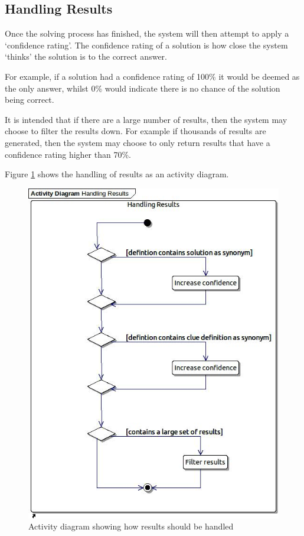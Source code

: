 \subsection{Handling Results} 
\label{sub:results}

Once the solving process has finished, the system will then attempt to apply a 
`confidence rating'. The confidence rating of a solution is how close the system
`thinks' the solution is to the correct answer.

For example, if a solution had a confidence rating of 100\% it would be deemed as 
the only answer, whilst 0\% would indicate there is no chance of the solution
being correct.

It is intended that if there are a large number of results, then the system may
choose to filter the results down. For example if thousands of results are 
generated, then the system may choose to only return results that have a 
confidence rating higher than 70\%.

Figure \ref{fig:results_activity} shows the handling of results as an activity 
diagram.

\begin{figure}[H]
  \centering
  \includegraphics[scale=0.6]{activity/handling_results.jpg}
  \caption{Activity diagram showing how results should be handled}
  \label{fig:results_activity}
\end{figure}
